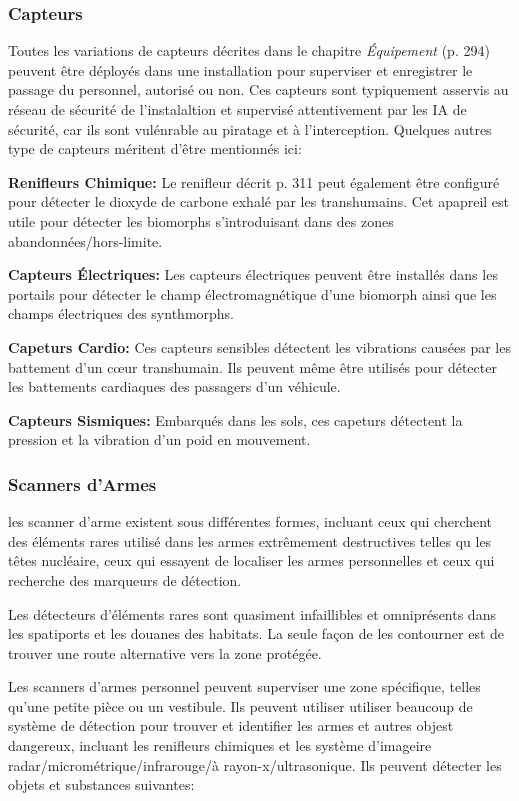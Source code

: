 \subsubsection{Capteurs} 

Toutes les variations de capteurs décrites dans le chapitre \textit{Équipement} (p. 294) peuvent être déployés dans une installation pour superviser et enregistrer le passage du personnel, autorisé ou non. Ces capteurs sont typiquement asservis au réseau de sécurité de l'instalaltion et supervisé attentivement par les IA de sécurité, car ils sont vulénrable au piratage et à l'interception. Quelques autres type de capteurs méritent d'être mentionnés ici: 

\textbf{Renifleurs Chimique:} Le renifleur décrit p. 311 peut également être configuré pour détecter le dioxyde de carbone exhalé par les transhumains. Cet apapreil est utile pour détecter les biomorphs s'introduisant dans des zones abandonnées/hors-limite. 

\textbf{Capteurs Électriques:} Les capteurs électriques peuvent être installés dans les portails pour détecter le champ électromagnétique d'une biomorph ainsi que les champs électriques des synthmorphs. 

\textbf{Capeturs Cardio:} Ces capteurs sensibles détectent les vibrations causées par les battement d'un cœur transhumain. Ils peuvent même être utilisés pour détecter les battements cardiaques des passagers d'un véhicule. 

\textbf{Capteurs Sismiques:} Embarqués dans les sols, ces capeturs détectent la pression et la vibration d'un poid en mouvement. 

\subsubsection{Scanners d'Armes} 

les scanner d'arme existent sous différentes formes, incluant ceux qui cherchent des éléments rares utilisé dans les armes extrêmement destructives telles qu les têtes nucléaire, ceux qui essayent de localiser les armes personnelles et ceux qui recherche des marqueurs de détection. 

Les détecteurs d'éléments rares sont quasiment infaillibles et omniprésents dans les spatiports et les douanes des habitats. La seule façon de les contourner est de trouver une route alternative vers la zone protégée. 

Les scanners d'armes personnel peuvent superviser une zone spécifique, telles qu'une petite pièce ou un vestibule. Ils peuvent utiliser utiliser beaucoup de système de détection pour trouver et identifier les armes et autres objest dangereux, incluant les renifleurs chimiques et les système d'imageire radar/micrométrique/infrarouge/à rayon-x/ultrasonique. Ils peuvent détecter les objets et substances suivantes: 

